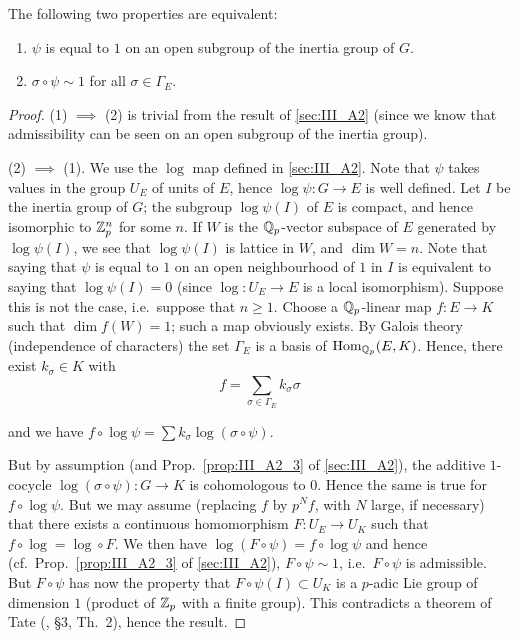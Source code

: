 \begin{subappendices}
\dpage

\begin{prop}\label{prop:III_A3_3}
The following two properties are equivalent:
\begin{enumerate}[(1)]
\item $\psi$ is equal to $1$ on an open subgroup of the inertia group of $G$.
\item $\sigma \circ \psi \sim 1$ for all $\sigma \in \Gamma_E$.
\end{enumerate}
\end{prop}

\begin{proof}
(1) $\implies$ (2) is trivial from the result of \ref{sec:III_A2}%
\label{errata:III_A2} (since we know that admissibility can be seen on an open
subgroup of the inertia group).

(2) $\implies$ (1). We use the $\log$ map defined in \ref{sec:III_A2}. Note that $\psi$ takes
values in the group $U_E$ of units of $E$, hence $\log \psi \colon G \to E$ is
well defined. Let $I$ be the inertia group of $G$; the subgroup $\log \psi(I)$
of $E$ is compact, and hence isomorphic to $\mathbb{Z}_p^n$ for some $n$. If $W$ is the
$\mathbb{Q}_p$-vector subspace of $E$ generated by $\log \psi(I)$, we see that $\log
\psi(I)$ is lattice in $W$, and $\dim W = n$. Note that saying that $\psi$ is
equal to $1$ on an open neighbourhood of $1$ in $I$ is equivalent to saying that
$\log \psi(I) = 0$ (since $\log \colon U_E \to E$ is a local isomorphism).
Suppose this is not the case, i.e.\ suppose that $n \geq 1$. Choose a
$\mathbb{Q}_p$-linear map $f \colon  E \to K$ such that $\dim f(W) = 1$; such a map
obviously exists. By Galois theory (independence of characters) the set
$\Gamma_E$ is a basis of $\operatorname{Hom}_{\mathbb{Q}_p} (E,K)$. Hence, there exist $k_\sigma \in
K$ with
\[
f = \sum_{\sigma \in \Gamma_E} k_\sigma \sigma
\]

and we have $f \circ \log \psi = \sum k_\sigma \log(\sigma \circ \psi)$.

\dpage

But by assumption (and Prop.~\ref{prop:III_A2_3} of \ref{sec:III_A2}), the
additive $1$-cocycle $\log(\sigma \circ \psi) \colon  G \to K$ is cohomologous
to $0$. Hence the same is true for $ f \circ \log \psi$.
But we may assume (replacing $f$ by $p^Nf$,  with $N$ large, if necessary) that
there exists a continuous homomorphism $F \colon U_E \to U_K$ such that $f
\circ \log = \log \circ F$.
We then have $\log (F \circ \psi) = f \circ \log \psi$ and hence (cf.\
Prop.~\ref{prop:III_A2_3} of \ref{sec:III_A2}), $F \circ \psi \sim 1$, i.e.\ $F
\circ \psi$ is admissible.
But $F \circ \psi$ has now the property that $F \circ \psi(I) \subset U_K$ is a
$p$-adic Lie group of dimension $1$ (product of $\mathbb{Z}_p$ with a finite group).
This contradicts a theorem of Tate (\cite{39}, \S3, Th.~2), hence the result.
\end{proof}


\end{subappendices}
